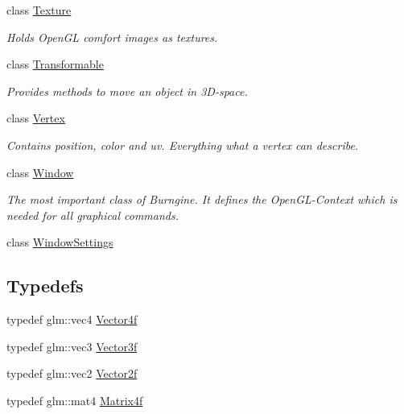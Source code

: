 \begin{DoxyCompactItemize}
class \hyperlink{classburn_1_1_texture}{Texture}
\begin{DoxyCompactList}\small\item\em Holds Open\-G\-L comfort images as textures. \end{DoxyCompactList}\item 
class \hyperlink{classburn_1_1_transformable}{Transformable}
\begin{DoxyCompactList}\small\item\em Provides methods to move an object in 3\-D-\/space. \end{DoxyCompactList}\item 
class \hyperlink{classburn_1_1_vertex}{Vertex}
\begin{DoxyCompactList}\small\item\em Contains position, color and uv. Everything what a vertex can describe. \end{DoxyCompactList}\item 
class \hyperlink{classburn_1_1_window}{Window}
\begin{DoxyCompactList}\small\item\em The most important class of Burngine. It defines the Open\-G\-L-\/\-Context which is needed for all graphical commands. \end{DoxyCompactList}\item 
class \hyperlink{classburn_1_1_window_settings}{Window\-Settings}
\end{DoxyCompactItemize}
\subsection*{Typedefs}
\begin{DoxyCompactItemize}
\item 
typedef glm\-::vec4 \hyperlink{namespaceburn_a2907b7b4adbde67cc68c401d9a30bdfe}{Vector4f}
\item 
typedef glm\-::vec3 \hyperlink{namespaceburn_a9d6d349c94bc4dc9699427216128a0ef}{Vector3f}
\item 
typedef glm\-::vec2 \hyperlink{namespaceburn_a2af71ec5609a2f2d501827804e86a9b8}{Vector2f}
\item 
typedef glm\-::mat4 \hyperlink{namespaceburn_a643e9d2ffceb4304e3755a100268a7a3}{Matrix4f}
\end{DoxyCompactItemize}
